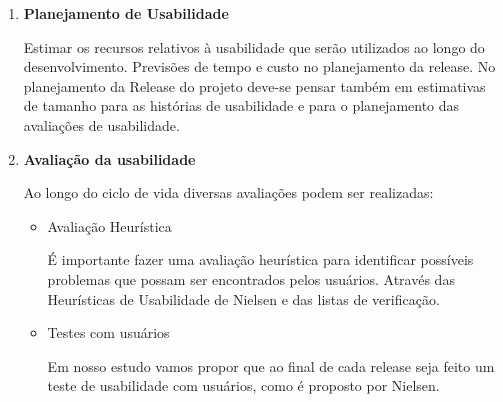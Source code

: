\begin{enumerate}
	
		
	\item \textbf{Planejamento de Usabilidade}

	Estimar os recursos relativos à usabilidade que serão utilizados ao longo do desenvolvimento. Previsões de tempo e custo no planejamento da release. No planejamento da Release do projeto deve-se pensar também em estimativas de tamanho para as histórias de usabilidade e para o planejamento das avaliações de usabilidade.


	\item \textbf{Avaliação da usabilidade}

	Ao longo do ciclo de vida diversas avaliações podem ser realizadas:
	
		
	\begin{itemize}
		\item Avaliação Heurística
		
		É importante fazer uma avaliação heurística para identificar possíveis problemas que possam ser encontrados pelos usuários. Através das Heurísticas de Usabilidade de Nielsen e das listas de verificação.
		
	
		\item Testes com usuários
		
		Em nosso estudo vamos propor que ao final de cada release seja feito um teste de usabilidade com usuários, como é proposto por Nielsen.
				
	\end{itemize} 
	

\end{enumerate}
